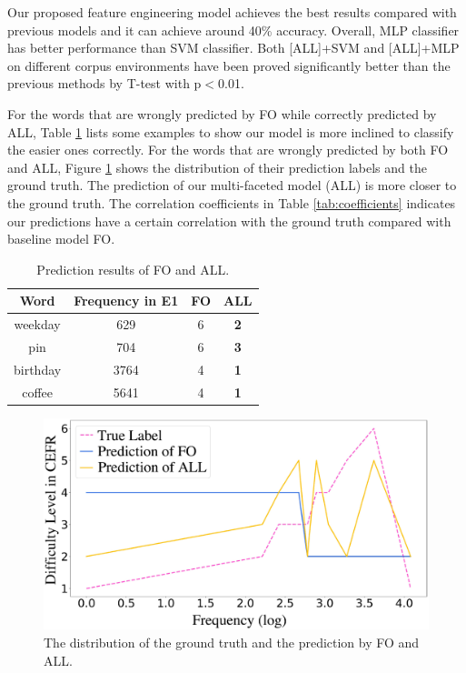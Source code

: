 Our proposed feature engineering model achieves the best results compared with previous models and it can achieve around 40\% accuracy.
Overall, MLP classifier has better performance than SVM classifier.
Both [ALL]+SVM and [ALL]+MLP on different corpus environments have been proved significantly better than the previous methods by T-test with p$<$0.01.
	
 
For the words that are wrongly predicted by FO while correctly predicted by ALL, Table \ref{tab:com} lists some examples to show our model is more inclined to classify the easier ones correctly.
For the words that are wrongly predicted by both FO and ALL, Figure \ref{fig:distance} shows the distribution of their prediction labels and the ground truth.
The prediction of our multi-faceted model (ALL) is more closer to the ground truth.
The correlation coefficients in Table \ref{tab:coefficients} indicates our predictions have a certain correlation with the ground truth compared with baseline model FO.
\begin{table}[th]
	\scriptsize
	\begin{center}
		\begin{tabular}{cccc}
			\hline
			\textbf{Word} & \textbf{Frequency in E1} & \textbf{FO} & \textbf{ALL} \\ \hline
			weekday & 629 & 6 & \textbf{2} \\ 
			pin & 704 & 6 & \textbf{3} \\ 
			birthday & 3764 & 4 & \textbf{1} \\ 
			coffee & 5641 & 4 & \textbf{1} \\ 
			\hline
		\end{tabular}
	\end{center}
	\vspace{-0.45cm}
	\caption{\label{tab:com} Prediction results of FO and ALL.}
\end{table}
\begin{figure}[th]
	\centering
	\includegraphics[width=1\linewidth]{pic/distance.eps} 
	\caption{The distribution of the ground truth and the prediction by FO and ALL.}
	\label{fig:distance}
\end{figure}
